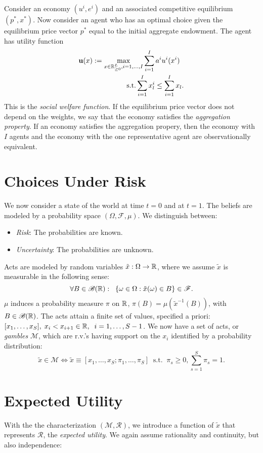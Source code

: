 \documentclass[twoside, titlepage]{article}
\begin{document}
Consider an economy $(u^i, e^i)$ and an associated competitive equilibrium $(p^*, x^*)$. Now consider an agent who has an optimal choice given the equilibrium price vector $p^*$ equal to the initial aggregate endowment. The agent has utility function
\begin{align*}
    \textbf{u}(x) := \max_{x \in \mathbb{R}_{\geq0}^L, i=1, \dots, I} \sum^I_{i=1}a^i u^i(x^i) \;\; \\ \text{s.t.} \sum^I_{i=1}x^i_l \leq \sum^I_{i=1}x_l.
\end{align*}
This is the \textit{social welfare function}. If the equilibrium price vector does not depend on the weights, we say that the economy satisfies the \textit{aggregation property}. If an economy satisfies the aggregation propery, then the economy with $I$ agents and the economy with the one representative agent are observationally equivalent.

\section{Choices Under Risk}

We now consider a state of the world at time $t=0$ and at $t=1$. The beliefs are modeled by a probability space $(\Omega, \mathcal{F}, \mu)$. We distinguish between:
\begin{itemize}
    \item \textit{Risk}: The probabilities are known.
    \item \textit{Uncertainty}: The probabilities are unknown.
\end{itemize}
Acts are modeled by random variables $\tilde{x}: \Omega \rightarrow \mathbb{R}$, where we assume $\tilde{x}$ is measurable in the following sense:
\[
    \forall B \in \mathcal{B}(\mathbb{R}) : \;\; \{ \omega \in \Omega : \tilde{x}(\omega) \in B \} \in \mathcal{F}.
\]
$\mu$ induces a probability measure $\pi$ on $\mathbb{R}$, $\pi(B) = \mu(\tilde{x}^{-1}(B))$, with $B \in \mathcal{B}(\mathbb{R})$. The acts attain a finite set of values, specified a priori: $ [ x_1, \dots, x_S ], \; x_i < x_{i+1} \in \mathbb{R}, \;\; i = 1, \dots, S - 1$. We now have a set of acts, or \textit{gambles} $\mathcal{M}$, which are r.v.'s having support on the $x_i$ identified by a probability distribution:
\[
    \tilde{x} \in \mathcal{M} \iff \tilde{x} \equiv [x_1, \dots, x_S ; \pi_1, \dots, \pi_S] \;\; \text{s.t.} \;\; \pi_s \geq 0, \sum^S_{s=1}\pi_s = 1.
\]


\section{Expected Utility}
With the the characterization $(\mathcal{M}, \mathcal{R})$, we introduce a function of $\tilde{x}$ that represents $\mathcal{R}$, the \textit{expected utility}. We again assume rationality and continuity, but also independence:
\end{document}
